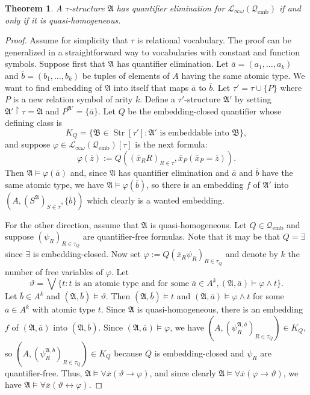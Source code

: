 \documentclass{ndjflart}
\theoremstyle{plain}
\newtheorem{theorem}[conjecture]{Theorem}
\theoremstyle{definition}
\numberwithin{equation}{section}
\DeclareMathOperator{\emb}{emb}
\DeclareMathOperator{\Str}{Str}
\begin{document}
\begin{theorem}\label{homog}
A $\tau$-structure $\mathfrak{A}$ has quantifier elimination for $\mathcal{L}_{\infty\omega}(\mathcal{Q}_{\emb})$ if and only if it is quasi-homogeneous.
\end{theorem}
\begin{proof}
Assume for simplicity that $\tau$ is relational vocabulary.
The proof can be generalized in a straightforward way to vocabularies with constant and function symbols.
Suppose first that $\mathfrak{A}$ has quantifier elimination.
Let $\overline{a} = (a_1,\dots,a_k)$ and $\overline{b} = (b_1,\dots,b_k)$ be tuples of elements of $A$ having the same atomic type.
We want to find embedding of $\mathfrak{A}$ into itself that maps $\overline{a}$ to $\overline{b}$.
Let $\tau' = \tau \cup \{P\}$ where $P$ is a new relation symbol of arity $k$.
Define a $\tau'$-structure $\mathfrak{A}'$ by setting $\mathfrak{A}'\upharpoonright \tau = \mathfrak{A}$ and $P^{\mathfrak{A}'} = \{\overline{a}\}$.
Let $Q$ be the embedding-closed quantifier whose defining class is
\[
	K_Q = \{\mathfrak{B} \in \Str[\tau'] \colon \mathfrak{A}' \text{ is embeddable into } \mathfrak{B}\},
\]
and suppose $\varphi \in \mathcal{L}_{\infty\omega}(\mathcal{Q}_{\emb})[\tau]$ is the next formula:
\[
	\varphi(\overline{z}) := Q((\overline{x}_RR)_{R\in\tau},\overline{x}_P(\overline{x}_P=\overline{z})).
\]
Then $\mathfrak{A} \vDash \varphi(\overline{a})$ and, since $\mathfrak{A}$ has quantifier elimination and $\overline{a}$ and $\overline{b}$ have the same atomic type, we have $\mathfrak{A} \vDash \varphi(\overline{b})$, so there is an embedding $f$ of $\mathfrak{A}'$ into $(A,(S^{\mathfrak{A}})_{S\in\tau}, \{\overline{b}\})$ which clearly is a wanted embedding.

For the other direction, assume that $\mathfrak{A}$ is quasi-homogeneous. Let $Q \in \mathcal{Q}_{\emb}$ and suppose $(\psi_R)_{R \in \tau_Q}$ are quantifier-free formulas.
Note that it may be that $Q = \exists$ since $\exists$ is embedding-closed.
Now set $\varphi := Q(\overline{x}_R\psi_R)_{R \in \tau_Q}$ and denote by $k$ the number of free variables of $\varphi$.
Let
\[
	\vartheta = \bigvee\{t \colon t \text{ is an atomic type and for some } \overline{a} \in A^k, (\mathfrak{A}, \overline{a}) \vDash \varphi \wedge t\}.
\]
Let $\overline{b} \in A^k$ and $(\mathfrak{A}, \overline{b}) \vDash \vartheta$.
Then $(\mathfrak{A},\overline{b}) \vDash t$ and $(\mathfrak{A},\overline{a}) \vDash \varphi \wedge t$ for some $\overline{a} \in A^k$ with atomic type $t$.
Since $\mathfrak{A}$ is quasi-homogeneous, there is an embedding $f$ of  $(\mathfrak{A},\overline{a})$ into $(\mathfrak{A},\overline{b})$.
Since $(\mathfrak{A},\overline{a}) \vDash \varphi$, we have $(A,(\psi^{\mathfrak{A},\overline{a}}_R)_{R \in \tau_Q}) \in K_Q$,
so $(A,(\psi^{\mathfrak{A},\overline{b}}_R)_{R \in \tau_Q}) \in K_Q$
because $Q$ is embedding-closed and $\psi_R$ are quantifier-free.
Thus, $\mathfrak{A} \vDash \forall \overline{x}(\vartheta \rightarrow \varphi)$,
and since clearly $\mathfrak{A} \vDash \forall \overline{x}(\varphi \rightarrow \vartheta)$, we have $\mathfrak{A} \vDash \forall \overline{x}(\vartheta \leftrightarrow \varphi)$.


\end{proof}
\end{document}
